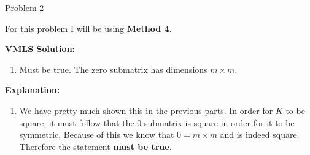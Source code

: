 \begin{problem}{Problem 2}
    \begin{highlight}
        For this problem I will be using \textbf{Method 4}. \vspace*{1em}

        \noindent \textbf{VMLS Solution:}

        \begin{enumerate}[label = (\alph*), start = 5]
            \item Must be true. The zero submatrix has dimensions $m \times m$.
        \end{enumerate}

        \noindent \textbf{Explanation:}

        \begin{enumerate}[label = (\alph*), start = 5]
            \item We have pretty much shown this in the previous parts. In order for $K$ to be square, it must follow that the 0 submatrix is square in order for it to be symmetric. Because of this
            we know that $0 = m \times m$ and is indeed square. Therefore the statement \textbf{must be true}.
        \end{enumerate}
    \end{highlight}
\end{problem}

